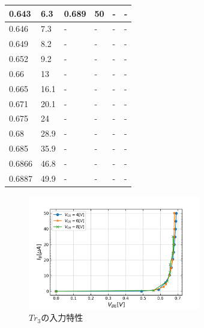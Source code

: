 \documentclass[10pt, a4j, dvipdfmx]{jarticle}
\begin{document}
\begin{table}[H]
\begin{tabular}{|l|l|l|l|l|l|}
        0.643                   & 6.3      & 0.689                   & 50       & -                       & -        \\ \hline
        0.646                   & 7.3      & -                       & -        & -                       & -        \\ \hline
        0.649                   & 8.2      & -                       & -        & -                       & -        \\ \hline
        0.652                   & 9.2      & -                       & -        & -                       & -        \\ \hline
        0.66                    & 13       & -                       & -        & -                       & -        \\ \hline
        0.665                   & 16.1     & -                       & -        & -                       & -        \\ \hline
        0.671                   & 20.1     & -                       & -        & -                       & -        \\ \hline
        0.675                   & 24       & -                       & -        & -                       & -        \\ \hline
        0.68                    & 28.9     & -                       & -        & -                       & -        \\ \hline
        0.685                   & 35.9     & -                       & -        & -                       & -        \\ \hline
        0.6866                  & 46.8     & -                       & -        & -                       & -        \\ \hline
        0.6887                  & 49.9     & -                       & -        & -                       & -        \\ \hline
        \end{tabular}
        \normalsize
    \end{table}
    \begin{figure}[H]
        \centering
        \includegraphics[height=50mm]{ex-3.png}
        \caption{$Tr_3$の入力特性}
        \label{ex:3}    
    \end{figure}
\end{document}
